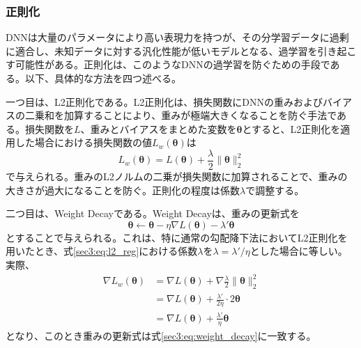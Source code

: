 \documentclass[12pt]{jarticle}
\numberwithin{equation}{section}    %
\numberwithin{figure}{section}      %
\numberwithin{table}{section}      %
\begin{document}
\subsubsection{正則化}
DNNは大量のパラメータにより高い表現力を持つが、その分学習データに過剰に適合し、未知データに対する汎化性能が低いモデルとなる、過学習を引き起こす可能性がある。正則化は、このようなDNNの過学習を防ぐための手段である。以下、具体的な方法を四つ述べる。

一つ目は、L2正則化である。L2正則化は、損失関数にDNNの重みおよびバイアスの二乗和を加算することにより、重みが極端大きくなることを防ぐ手法である。損失関数を$L$、重みとバイアスをまとめた変数を$\bm{\theta}$とすると、L2正則化を適用した場合における損失関数の値$L_{w}(\bm{\theta})$は
\begin{equation}
    \label{sec3:eq:l2_reg}
    L_{w}(\bm{\theta}) = L(\bm{\theta}) + \frac{\lambda}{2} \|\bm{\theta}\|_{2}^{2}
\end{equation}
で与えられる。重みのL2ノルムの二乗が損失関数に加算されることで、重みの大きさが過大になることを防ぐ。正則化の程度は係数$\lambda$で調整する。

二つ目は、Weight Decayである。Weight Decayは、重みの更新式を
\begin{equation}
    \label{sec3:eq:weight_decay}
    \bm{\theta} \leftarrow \bm{\theta} - \eta \nabla L(\bm{\theta}) - \lambda' \bm{\theta}
\end{equation}
とすることで与えられる。これは、特に通常の勾配降下法においてL2正則化を用いたとき、式\eqref{sec3:eq:l2_reg}における係数$\lambda$を$\lambda = \lambda' / \eta$とした場合に等しい\cite{loshchilov2017decoupled}。実際、
\begin{align}
    \nabla L_{w}(\bm{\theta}) & = \nabla L(\bm{\theta}) + \nabla \frac{\lambda}{2} \|\bm{\theta}\|_{2}^{2} \\
                              & = \nabla L(\bm{\theta}) + \frac{\lambda'}{2\eta} \cdot 2\bm{\theta}        \\
                              & = \nabla L(\bm{\theta}) + \frac{\lambda'}{\eta} \bm{\theta}
\end{align}
となり、このとき重みの更新式は式\eqref{sec3:eq:weight_decay}に一致する。
\end{document}
